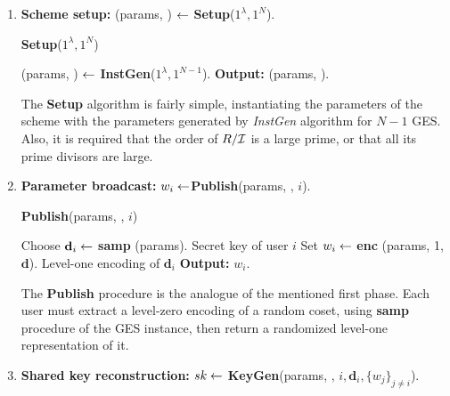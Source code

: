 \begin{enumerate}
	\item \textbf{Scheme setup: } 	(params, \pzt) $\leftarrow$ \textbf{Setup}($1^\lambda, 1^N$).
	
	\begin{tcolorbox}[colframe=black,colback=white,arc=0pt,outer arc=0pt]
		\begin{center}
			\textbf{Setup}($1^\lambda, 1^N$)
		\end{center}
		\begin{algorithmic}[1]
			\State (params, \pzt) $\leftarrow$ \textbf{InstGen}($1^\lambda, 1^{N-1}$).
			\State \textbf{Output:} (params, \pzt).
		\end{algorithmic}
	\end{tcolorbox}

	The \textbf{Setup} algorithm is fairly simple, instantiating the parameters of the scheme with the parameters generated by \textit{InstGen} algorithm for $N-1$ GES. Also, it is required that the order of $R/\mathcal{I}$ is a large prime, or that all its prime divisors are large.\\
	
	\item \textbf{Parameter broadcast:} $w_i \leftarrow $\textbf{Publish}(params, \pzt, $i$).
	
		\begin{tcolorbox}[colframe=black,colback=white,arc=0pt,outer arc=0pt]
		\begin{center}
			\textbf{Publish}(params, \pzt, $i$)
		\end{center}
		\begin{algorithmic}[1]
			\State Choose $\textbf{d}_i \leftarrow $ \textbf{samp} (params). \Comment Secret key of user $i$
			\State Set $w_i \leftarrow $ \textbf{enc} (params, 1, $\textbf{d}$). \Comment Level-one encoding of $\textbf{d}_i$
			\State \textbf{Output:} $w_i$.
		\end{algorithmic}
	\end{tcolorbox}

	The \textbf{Publish} procedure is the analogue of the mentioned first phase. Each user must extract a level-zero encoding of a random coset, using \textbf{samp} procedure of the GES instance, then return a randomized level-one representation of it.\\
	
	\item \textbf{Shared key reconstruction:} $sk \leftarrow$ \textbf{KeyGen}(params, \pzt, $i, \textbf{d}_i, \{w_j\}_{j \neq i}$).
	

\end{enumerate}
